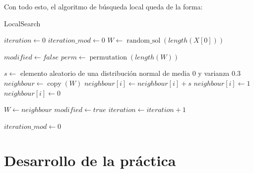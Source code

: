 \documentclass[11pt,a4paper]{article}
\begin{document}
Con todo esto, el algoritmo de búsqueda local queda de la forma: \\
\begin{algorithm}[H]
	\caption{{\sc LocalSearch}}
	
	$iteration \gets 0$ \;
	$iteration\_mod \gets 0$ \;
	$W \gets \operatorname{random\_sol}(length(X[0]))$ \;
	 {
		$modified \gets false$ \;
		$perm \gets \operatorname{permutation}(length(W))$ \;
		
		 {
			$s \gets$ elemento aleatorio de una distribución normal de media 0 y varianza 0.3 \;
			$neighbour \gets \operatorname{copy}(W)$ \;
			$neighbour[i] \gets neighbour[i] + s$ \;
			 {
				$neighbour[i] \gets 1$ \;
			}  {
				$neighbour[i] \gets 0$ \;
			}
			
			 {
				$W \gets neighbour$ \;
				$modified \gets true$ \;
			}
			$iteration \gets iteration + 1$ \;
		} 
		 {
			$iteration\_mod \gets 0$ \;
		} 
	}
	 \;
\end{algorithm}

\newpage
\section{Desarrollo de la práctica}
\end{document}
